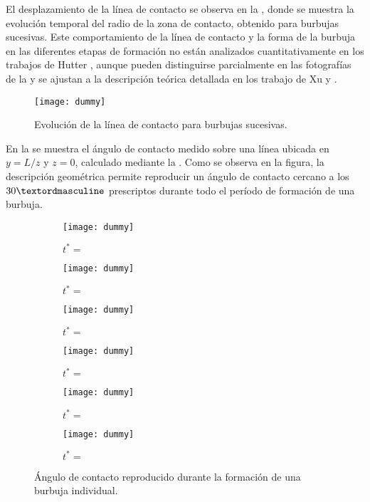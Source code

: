 El desplazamiento de la l\'inea de contacto se observa en la , donde se muestra la evoluci\'on temporal del radio de la zona de contacto, obtenido para burbujas sucesivas. Este comportamiento de la l\'inea de contacto y la forma de la burbuja en las diferentes etapas de formaci\'on no est\'an analizados cuantitativamente en los trabajos de Hutter \cite{hutter_experimental_2009, hutter_experimental_2010}, aunque pueden distinguirse parcialmente en las fotograf\'ias de la  y se ajustan a la descripci\'on te\'orica detallada en los trabajo de Xu \cite{xu_single-bubble_2014} y .

\begin{figure}[ht]
	\centering
	\texttt{[image: dummy]}
	\caption{Evoluci\'on de la l\'inea de contacto para burbujas sucesivas.}
	\label{fig:linea_contacto}
\end{figure}

En la  se muestra el \'angulo de contacto medido sobre una l\'inea ubicada en $y=L/z$ y $z=0$, calculado mediante la . Como se observa en la figura, la descripci\'on geom\'etrica permite reproducir un \'angulo de contacto cercano a los $30\textordmasculine$ prescriptos durante todo el per\'iodo de formaci\'on de una burbuja.

\begin{figure}[htb]
    \centering
    \begin{subfigure}[t]{0.45\textwidth}
        \centering
        \texttt{[image: dummy]}
        \caption{$t^*=$}
    \end{subfigure}
    \begin{subfigure}[t]{0.45\textwidth}
        \centering
        \texttt{[image: dummy]}
        \caption{$t^*=$}
    \end{subfigure}
    \begin{subfigure}[t]{0.45\textwidth}
        \centering
        \texttt{[image: dummy]}
        \caption{$t^*=$}
    \end{subfigure}
    \begin{subfigure}[t]{0.45\textwidth}
        \centering
        \texttt{[image: dummy]}
        \caption{$t^*=$}
    \end{subfigure}
    \begin{subfigure}[t]{0.45\textwidth}
        \centering
        \texttt{[image: dummy]}
        \caption{$t^*=$}
    \end{subfigure}
    \begin{subfigure}[t]{0.45\textwidth}
        \centering
        \texttt{[image: dummy]}
        \caption{$t^*=$}
    \end{subfigure}            
    \caption{\'Angulo de contacto reproducido durante la formaci\'on de una burbuja individual.}
    \label{fig:evolucion_contacto}
\end{figure}
\FloatBarrier 

